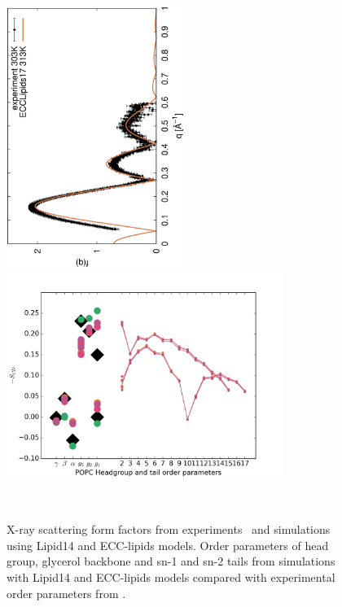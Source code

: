 \documentclass[aip,jcp,twocolumn]{revtex4}
\begin{document}
\begin{figure}[tbp]
  \centering
  \includegraphics[height=8.5cm,angle=-90]{../Fig/form-f_exp-l14-eccl17.eps}
  \includegraphics[width=9.0cm]{../Fig/ipython_nb/Order-parameters_exp-L14-ECCL17_q80_sig89.png}
  \caption{\label{simVSexpNOions}
    X-ray scattering form factors from experiments~\cite{Kucerka2011} and simulations using Lipid14 \cite{dickson14} and ECC-lipids models. 
    Order parameters of head group, glycerol backbone and sn-1 and sn-2 tails  from simulations with Lipid14 \cite{dickson14} and ECC-lipids models
    compared with experimental order parameters from \cite{ferreira13}.}
   \\
\end{figure}
\end{document}
